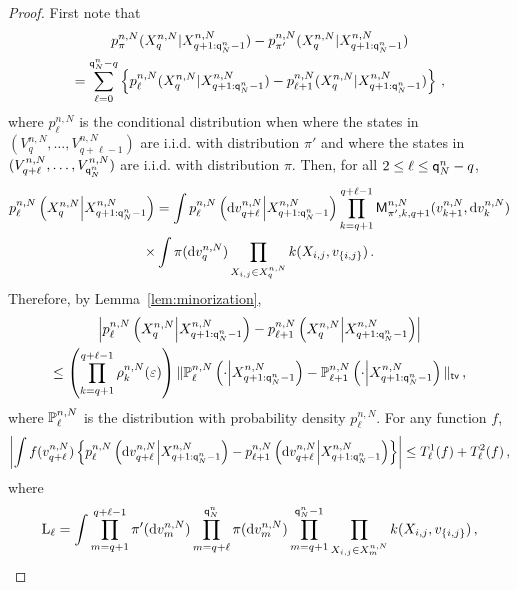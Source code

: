 \begin{proof}
First note that
\begin{multline*}
p_{\pi}^{n,N}(X_{q}^{n,N}|X_{q+1:{\mathsf{q}}^{n}_{N}-1}^{n,N}) - p_{\pi'}^{n,N}(X_{q}^{n,N}|X_{q+1:{\mathsf{q}}^{n}_{N}-1}^{n,N}) \\ = \sum_{\ell= 0}^{{\mathsf{q}}^{n}_{N}-q}\left\{p_{\ell}^{n,N}(X_{q}^{n,N}|X_{q+1:{\mathsf{q}}^{n}_{N}-1}^{n,N}) - p_{\ell+1}^{n,N}(X_{q}^{n,N}|X_{q+1:{\mathsf{q}}^{n}_{N}-1}^{n,N})\right\}\,,
\end{multline*}
where $p_{\ell}^{n,N}$ is the conditional distribution when where the states in $(V_q^{n,N},\ldots,V_{q+\ell-1}^{n,N})$ are i.i.d. with distribution $\pi'$ and where  the states in $(V_{q+\ell}^{n,N},\ldots,V_{{\mathsf{q}}^{n}_{N}}^{n,N})$ are i.i.d. with distribution $\pi$. Then, for all $2\le \ell \le {\mathsf{q}}^{n}_{N}-q$,
\begin{multline*}
p_{\ell}^{n,N}\left(X^{n,N}_{q}\middle|X^{n,N}_{q+1:{\mathsf{q}}^{n}_{N}-1}\right) = \int p^{n,N}_{\ell}\left(\mathrm{d} v_{q+\ell}^{n,N}\middle | X^{n,N}_{q+1:{\mathsf{q}}^{n}_{N}-1}\right) \prod_{k = q+1}^{q+\ell-1}\mathsf{M}^{n,N}_{\pi',k,q+1}(v_{k+1}^{n,N},\mathrm{d} v_k^{n,N})\\
\times\int \pi(\mathrm{d} v_q^{n,N})\prod_{X_{i,j}\in X_{q}^{n,N}}k(X_{i,j},v_{\{i,j\}})\,.
\end{multline*}
Therefore, by Lemma~\ref{lem:minorization},
\begin{multline*}
\left|p_{\ell}^{n,N}\left(X^{n,N}_{q}\middle|X^{n,N}_{q+1:{\mathsf{q}}^{n}_{N}-1}\right)-p_{\ell+1}^{n,N}\left(X^{n,N}_{q}\middle|X^{n,N}_{q+1:{\mathsf{q}}^{n}_{N}-1}\right)\right|\\
\le \left(\prod_{k = q+1}^{q+\ell-1}\rho^{n,N}_k(\varepsilon)\right)\|\mathbb{P}^{n,N}_{\ell}\left(\cdot\middle | X^{n,N}_{q+1:{\mathsf{q}}^{n}_{N}-1}\right)-\mathbb{P}^{n,N}_{\ell+1}\left(\cdot\middle | X^{n,N}_{q+1:{\mathsf{q}}^{n}_{N}-1}\right)\|_{\mathsf{tv}}\,,
\end{multline*}
where $\mathbb{P}^{n,N}_{\ell}$ is the distribution with probability density $p^{n,N}_{\ell}$. For any function $f$,
\[
\left|\int f(v_{q+\ell}^{n,N})\left\{p^{n,N}_{\ell}\left(\mathrm{d} v_{q+\ell}^{n,N}\middle | X^{n,N}_{q+1:{\mathsf{q}}^{n}_{N}-1}\right)-p^{n,N}_{\ell+1}\left(\mathrm{d} v_{q+\ell}^{n,N}\middle | X^{n,N}_{q+1:{\mathsf{q}}^{n}_{N}-1}\right)\right\}\right|\le T^1_{\ell}(f) + T^2_{\ell}(f)\,,
\]
where
\begin{align*}
\mathrm{L}_{\ell}&= \int \prod_{m=q+1}^{q+\ell-1}\pi'(\rmd v^{n,N}_m)\prod_{m=q+\ell}^{\ordermax{n}{N}}\pi(\rmd v^{n,N}_m)\prod_{m=q+1}^{\ordermax{n}{N}-1}\prod_{X_{i,j}\in X^{n,N}_m}\condlik(X_{i,j},v_{\{i,j\}})\eqsp,\\

\end{align*}
\end{proof}
